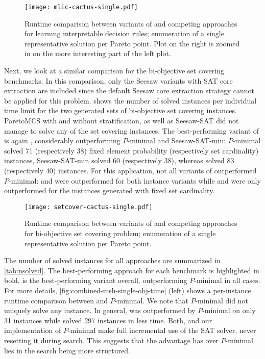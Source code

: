 \begin{figure}
    \centering
    \texttt{[image: mlic-cactus-single.pdf]}
    \caption{Runtime comparison between variants of \algname{} and competing approaches for learning interpretable decision rules;
      enumeration of a single representative solution per Pareto point.
      Plot on the right is zoomed in on the more interesting part of the left plot.
    }\label{fig:mlic-cactus-single}
\end{figure}

Next, we look at a similar comparison for the bi-objective set covering benchmarks.
In this comparison, only the Seesaw variants with SAT core extraction are included since the default Seesaw core extraction strategy cannot be applied for this problem.
 shows the number of solved instances per individual time limit for the two generated sets of bi-objective set covering instances.
ParetoMCS with and without stratification, as well as Seesaw-SAT did not manage to solve any of the set covering instances.
The best-performing variant of \algname{} is again \msh{}, considerably outperforming $P$-minimal and Seesaw-SAT-min:
$P$-minimal solved 71 (respectively 38) fixed element probability (respectively set cardinality) instances, Seesaw-SAT-min solved 60 (respectively 38), whereas \msh{} solved 83 (respectively 40) instances.
For this application, not all variants of \algname{} outperformed $P$-minimal:
\msu{} and \oll{} were outperformed for both instance variants while \satunsat{} and \unsatsat{} were only outperformed for the instances generated with fixed set cardinality.

\begin{figure}
    \centering
    \texttt{[image: setcover-cactus-single.pdf]}
    \caption{Runtime comparison between variants of \algname{} and competing approaches for bi-objective set covering problem;
      enumeration of a single representative solution per Pareto point.
    }\label{fig:setcover-cactus-single}
\end{figure}

The number of solved instances for all approaches are summarized in \cref{tab:nsolved}.
The best-performing approach for each benchmark is highlighted in bold.
\msh{} is the best-performing \algname{} variant overall, outperforming $P$-minimal in all cases.
For more details, \cref{fig:combined-msh-single-obj-time} (left) shows a per-instance runtime comparison between \msh{} and $P$-minimal.
We note that $P$-minimal did not uniquely solve any instance.
In general, \msh{} was outperformed by $P$-minimal on only 31 instances while \msh{} solved 297 instances in less time.
Both, \algname{} and our implementation of $P$-minimal make full incremental use of the SAT solver, never resetting it during search.
This suggests that the advantage \algname{} has over $P$-minimal lies in the search being more structured.

